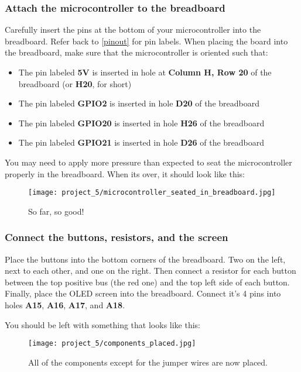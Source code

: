 \subsubsection{Attach the microcontroller to the breadboard}
Carefully insert the pins at the bottom of your microcontroller into the breadboard. Refer back to \ref{pinout} for pin labels.
When placing the board into the breadboard, make sure that the microcontroller is oriented such that:
\begin{itemize}
    \item The pin labeled \textbf{5V} is inserted in hole at \textbf{Column H, Row 20} of the breadboard (or \textbf{H20}, for short)
    \item The pin labeled \textbf{GPIO2} is inserted in hole \textbf{D20} of the breadboard
    \item The pin labeled \textbf{GPIO20} is inserted in hole \textbf{H26} of the breadboard
    \item The pin labeled \textbf{GPIO21} is inserted in hole \textbf{D26} of the breadboard
\end{itemize}
You may need to apply more pressure than expected to seat the microcontroller properly in the breadboard. When its over, it should look like this:
\begin{figure}[H]
    \centering
    \texttt{[image: project\_5/microcontroller\_seated\_in\_breadboard.jpg]}
    \caption{So far, so good!}
\end{figure}

\subsubsection{Connect the buttons, resistors, and the screen}
Place the buttons into the bottom corners of the breadboard. Two on the left, next to each other, and one on the right.
Then connect a resistor for each button between the top positive bus (the red one) and the top left side of each button.
Finally, place the OLED screen into the breadboard. Connect it's 4 pins into holes \textbf{A15}, \textbf{A16}, \textbf{A17}, and \textbf{A18}.

You should be left with something that looks like this:
\begin{figure}[H]
    \centering
    \texttt{[image: project\_5/components\_placed.jpg]}
    \caption{All of the components except for the jumper wires are now placed.}
\end{figure}

